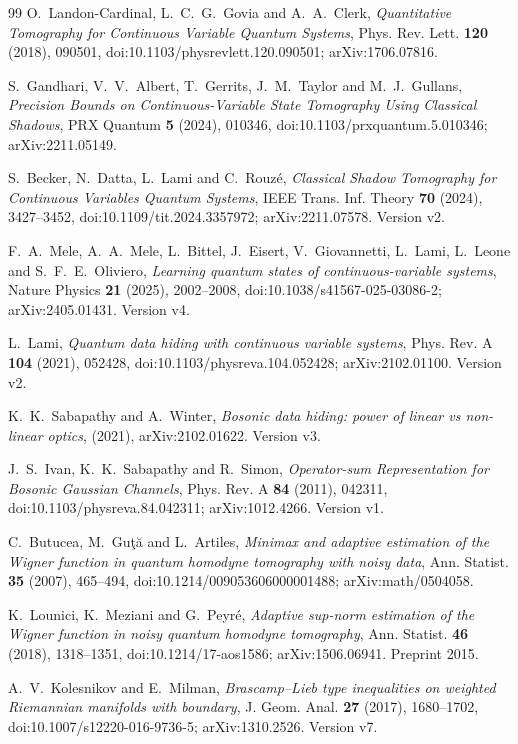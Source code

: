 \begin{thebibliography}{99}
O.~Landon-Cardinal, L.~C.~G.~Govia and A.~A.~Clerk,
\emph{Quantitative Tomography for Continuous Variable Quantum Systems},
Phys. Rev. Lett. \textbf{120} (2018), 090501,
doi:10.1103/physrevlett.120.090501; arXiv:1706.07816.

S.~Gandhari, V.~V.~Albert, T.~Gerrits, J.~M.~Taylor and M.~J.~Gullans,
\emph{Precision Bounds on Continuous-Variable State Tomography Using Classical Shadows},
PRX Quantum \textbf{5} (2024), 010346,
doi:10.1103/prxquantum.5.010346; arXiv:2211.05149.

S.~Becker, N.~Datta, L.~Lami and C.~Rouz\'e,
\emph{Classical Shadow Tomography for Continuous Variables Quantum Systems},
IEEE Trans. Inf. Theory \textbf{70} (2024), 3427--3452,
doi:10.1109/tit.2024.3357972; arXiv:2211.07578.
Version v2.

F.~A.~Mele, A.~A.~Mele, L.~Bittel, J.~Eisert, V.~Giovannetti, L.~Lami, L.~Leone and S.~F.~E.~Oliviero,
\emph{Learning quantum states of continuous-variable systems},
Nature Physics \textbf{21} (2025), 2002--2008,
doi:10.1038/s41567-025-03086-2; arXiv:2405.01431.
Version v4.

L.~Lami,
\emph{Quantum data hiding with continuous variable systems},
Phys. Rev. A \textbf{104} (2021), 052428,
doi:10.1103/physreva.104.052428; arXiv:2102.01100.
Version v2.

K.~K.~Sabapathy and A.~Winter,
\emph{Bosonic data hiding: power of linear vs non-linear optics},
(2021),
arXiv:2102.01622.
Version v3.

J.~S.~Ivan, K.~K.~Sabapathy and R.~Simon,
\emph{Operator-sum Representation for Bosonic Gaussian Channels},
Phys. Rev. A \textbf{84} (2011), 042311,
doi:10.1103/physreva.84.042311; arXiv:1012.4266.
Version v1.

C.~Butucea, M.~Gu\c{t}\u{a} and L.~Artiles,
\emph{Minimax and adaptive estimation of the Wigner function in quantum homodyne tomography with noisy data},
Ann. Statist. \textbf{35} (2007), 465--494,
doi:10.1214/009053606000001488; arXiv:math/0504058.

K.~Lounici, K.~Meziani and G.~Peyr\'e,
\emph{Adaptive sup-norm estimation of the Wigner function in noisy quantum homodyne tomography},
Ann. Statist. \textbf{46} (2018), 1318--1351,
doi:10.1214/17-aos1586; arXiv:1506.06941.
Preprint 2015.

A.~V.~Kolesnikov and E.~Milman,
\emph{Brascamp--Lieb type inequalities on weighted Riemannian manifolds with boundary},
J. Geom. Anal. \textbf{27} (2017), 1680--1702,
doi:10.1007/s12220-016-9736-5; arXiv:1310.2526.
Version v7.


\end{thebibliography}
